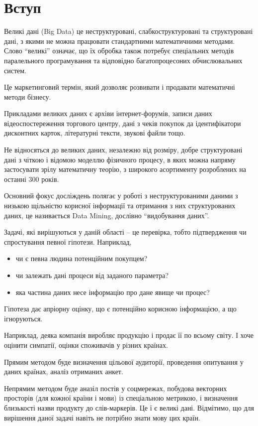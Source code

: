 \section{Вступ}

\begin{ozn}
 Великі дані (Big Data) це неструктуровані, слабкоструктуровані та структуровані дані, з якими не можна працювати стандартними математичними методами. Слово ``великі'' означає, що їх обробка також потребує спеціальних методів паралельного програмування та відповідно багатопроцесоних обчислювальних систем.
\end{ozn}

Це маркетинговий термін, який дозволяє розвивати і продавати математичні методи бізнесу. 

Прикладами великих даних є архіви інтернет-форумів, записи даних відеоспостереження торгового центру, дані з чеків покупок да ідентифікатори дисконтних карток, літературні тексти, звукові файли тощо.

Не відносяться до великих даних, незалежно від розміру, добре структуровані дані з чіткою і відомою моделлю фізичного процесу, в яких можна напряму застосувати зрілу математичну теорію, з широкого асортименту розроблених на останні 300 років.

Основний фокус досліждень полягає у роботі з неструктурованими даними з низькою щільністю корисної інформації та отримання з них структурованих даних, це називається Data Mining, дослівно ``видобування даних''.

Задачі, які вирішуються у даній області -- це перевірка, тобто підтвердження чи спростування певної гіпотези. Наприклад, 
\begin{itemize}
 \item чи є певна людина потенційним покупцем?
 \item чи залежать дані процеси від заданого параметра?
 \item яка частина даних несе інформацію про дане явище чи процес?
\end{itemize}

Гіпотеза дає апріорну оцінку, що є потенційно корисною інформацією, а що ігноруються.

Наприклад, деяка компанія виробляє продукцію і продає її по всьому світу. І хоче оцінити симпатії, оцінки споживачів у різних країнах. 

Прямим методом буде визначення цільової аудиторії, проведення опитування у даних країнах, аналіз отриманих анкет.

Непрямим методом буде аназіл постів у соцмережах, побудова векторних просторів (для кожної країни і мови) із спеціальною метрикою, і визначення близькості назви продукту до слів-маркерів. Це ї є великі дані. Відмітимо, що для вирішення даної задачі навіть не потрібно знати мову цих країн.

